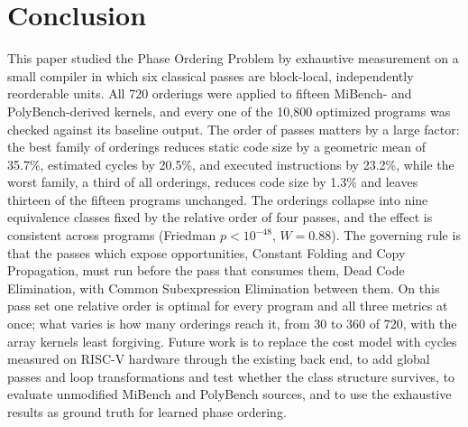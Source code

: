 \documentclass[conference]{IEEEtran}
\begin{document}
\section{Conclusion}
This paper studied the Phase Ordering Problem by exhaustive measurement on a small compiler in which six classical passes are block-local, independently reorderable units. All 720 orderings were applied to fifteen MiBench- and PolyBench-derived kernels, and every one of the 10,800 optimized programs was checked against its baseline output. The order of passes matters by a large factor: the best family of orderings reduces static code size by a geometric mean of 35.7\%, estimated cycles by 20.5\%, and executed instructions by 23.2\%, while the worst family, a third of all orderings, reduces code size by 1.3\% and leaves thirteen of the fifteen programs unchanged. The orderings collapse into nine equivalence classes fixed by the relative order of four passes, and the effect is consistent across programs (Friedman $p < 10^{-48}$, $W = 0.88$). The governing rule is that the passes which expose opportunities, Constant Folding and Copy Propagation, must run before the pass that consumes them, Dead Code Elimination, with Common Subexpression Elimination between them. On this pass set one relative order is optimal for every program and all three metrics at once; what varies is how many orderings reach it, from 30 to 360 of 720, with the array kernels least forgiving. Future work is to replace the cost model with cycles measured on RISC-V hardware through the existing back end, to add global passes and loop transformations and test whether the class structure survives, to evaluate unmodified MiBench and PolyBench sources, and to use the exhaustive results as ground truth for learned phase ordering.
\end{document}

